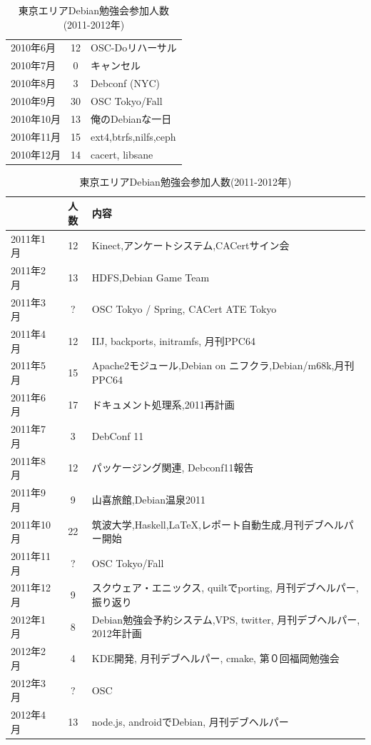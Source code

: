 \documentclass[mingoth,a4paper]{jsarticle}
\begin{document}
\begin{table}[t]
\begin{minipage}{0.5\hsize}
\begin{center}
\begin{tabular}{|l|c|p{10em}|}
   2010年6月 & 12 & OSC-Doリハーサル  \\
   2010年7月 & 0 & キャンセル  \\
   2010年8月 & 3 & Debconf (NYC) \\
   2010年9月 & 30 & OSC Tokyo/Fall \\
   2010年10月 & 13 & 俺のDebianな一日 \\
   2010年11月 & 15 & ext4,btrfs,nilfs,ceph \\
   2010年12月 & 14 &  cacert, libsane \\
 \hline
  \end{tabular}
 \end{center}
\end{minipage}
\begin{minipage}{0.5\hsize}
 \caption{東京エリアDebian勉強会参加人数(2011-2012年)}\label{tab:count2011}
 \begin{center}
  \begin{tabular}{|l|c|p{12em}|}
 \hline
 & 人数 & 内容\\
 \hline
   2011年1月 & 12 & Kinect,アンケートシステム,CACertサイン会 \\
   2011年2月 & 13 & HDFS,Debian Game Team \\
   2011年3月 & ? & OSC Tokyo / Spring, CACert ATE Tokyo \\
   2011年4月 & 12 & IIJ, backports, initramfs, 月刊PPC64 \\
   2011年5月 & 15 & Apache2モジュール,Debian on ニフクラ,Debian/m68k,月刊PPC64 \\
   2011年6月 & 17 & ドキュメント処理系,2011再計画 \\
   2011年7月 & 3 & DebConf 11 \\
   2011年8月 & 12 & パッケージング関連, Debconf11報告 \\
   2011年9月 & 9 & 山喜旅館,Debian温泉2011 \\
   2011年10月 & 22 & 筑波大学,Haskell,LaTeX,レポート自動生成,月刊デブヘルパー開始\\
   2011年11月 & ? & OSC Tokyo/Fall \\
   2011年12月 & 9 & スクウェア・エニックス, quiltでporting, 月刊デブヘルパー,
	   振り返り \\
   2012年1月 & 8 & Debian勉強会予約システム,VPS, twitter, 
	   月刊デブヘルパー, 2012年計画 \\
   2012年2月 & 4 & KDE開発, 月刊デブヘルパー, cmake, 第０回福岡勉強会\\
   2012年3月 & ? & OSC \\
   2012年4月 & 13 & node.js, androidでDebian, 月刊デブヘルパー\\

\end{tabular}
\end{center}
\end{minipage}
\end{table}
\end{document}
